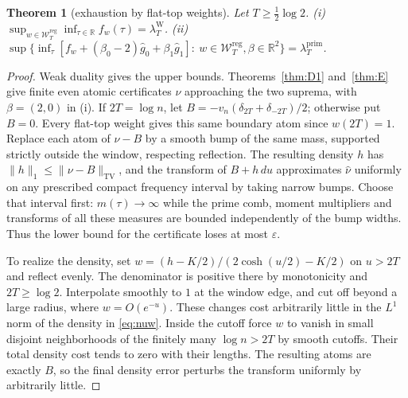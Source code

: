 \documentclass[10pt]{amsart}
\newtheorem{theorem}{Theorem}[section]
\theoremstyle{definition}
\theoremstyle{remark}
\newcommand{\R}{\mathbb R}
\newcommand{\TV}{\operatorname{TV}}
\newcommand{\lamP}{\lambda^{\mathrm{prim}}_T}
\newcommand{\lamW}{\lambda^{\mathrm W}_T}
\newcommand{\gh}[1]{\widehat g_{#1}}
\newcommand{\Wcl}{\mathcal W_T}
\begin{document}
\begin{theorem}[exhaustion by flat-top weights]\label{thm:Zexh}
Let $T\ge\frac12\log2$. \emph{(i)} $\sup_{w\in\Wcl^{\mathrm{reg}}}\inf_{\tau\in\R}f_w(\tau)=\lamW$.
\emph{(ii)} $\sup\{\inf_\tau[f_w+(\beta_0-2)\gh0+\beta_1\gh1]:\ w\in\Wcl^{\mathrm{reg}},\beta\in\R^2\}=\lamP$.
\end{theorem}
\begin{proof}
Weak duality gives the upper bounds. Theorems~\ref{thm:D1}
and~\ref{thm:E} give finite even atomic certificates $\nu$ approaching
the two suprema, with $\beta=(2,0)$ in (i). If $2T=\log n$, let
$B=-v_n(\delta_{2T}+\delta_{-2T})/2$; otherwise put $B=0$.
Every flat-top weight gives this same boundary atom since $w(2T)=1$.
Replace each atom of $\nu-B$ by a smooth bump of the same mass,
supported strictly outside the window, respecting reflection. The
resulting density $h$ has $\|h\|_1\le\|\nu-B\|_{\TV}$, and the
transform of $B+h\,du$ approximates $\widehat\nu$ uniformly on
any prescribed compact frequency interval by taking narrow bumps.
Choose that interval first: $m(\tau)\to\infty$ while the prime comb,
moment multipliers and transforms of all these measures are bounded
independently of the bump widths. Thus the lower bound for the
certificate loses at most $\varepsilon$.

To realize the density, set $w=(h-K/2)/(2\cosh(u/2)-K/2)$ on
$u>2T$ and reflect evenly. The denominator is positive there by
monotonicity and $2T\ge\log2$. Interpolate smoothly to $1$ at the
window edge, and cut off beyond a large radius, where $w=O(e^{-u})$.
These changes cost arbitrarily little in the $L^1$ norm of the density
in \eqref{eq:nuw}. Inside the cutoff force $w$ to vanish in small
disjoint neighborhoods of the finitely many $\log n>2T$ by smooth
cutoffs. Their total density cost tends to zero with their lengths.
The resulting atoms are exactly $B$, so the final density error
perturbs the transform uniformly by arbitrarily little.
\end{proof}
\end{document}
